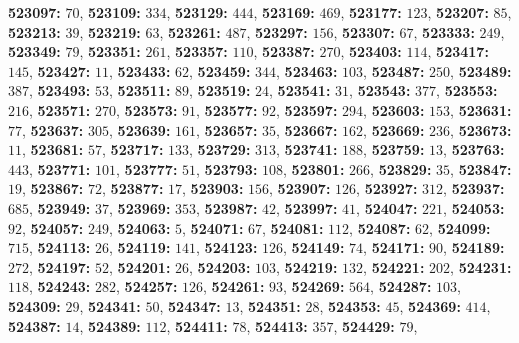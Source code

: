 \textsf{\bfseries 523097:} $70$, \textsf{\bfseries 523109:} $334$, \textsf{\bfseries 523129:} $444$, \textsf{\bfseries 523169:} $469$, \textsf{\bfseries 523177:} $123$, \textsf{\bfseries 523207:} $85$, \textsf{\bfseries 523213:} $39$, \textsf{\bfseries 523219:} $63$, \textsf{\bfseries 523261:} $487$, \textsf{\bfseries 523297:} $156$, \textsf{\bfseries 523307:} $67$, \textsf{\bfseries 523333:} $249$, \textsf{\bfseries 523349:} $79$, \textsf{\bfseries 523351:} $261$, \textsf{\bfseries 523357:} $110$, \textsf{\bfseries 523387:} $270$, \textsf{\bfseries 523403:} $114$, \textsf{\bfseries 523417:} $145$, \textsf{\bfseries 523427:} $11$, \textsf{\bfseries 523433:} $62$, \textsf{\bfseries 523459:} $344$, \textsf{\bfseries 523463:} $103$, \textsf{\bfseries 523487:} $250$, \textsf{\bfseries 523489:} $387$, \textsf{\bfseries 523493:} $53$, \textsf{\bfseries 523511:} $89$, \textsf{\bfseries 523519:} $24$, \textsf{\bfseries 523541:} $31$, \textsf{\bfseries 523543:} $377$, \textsf{\bfseries 523553:} $216$, \textsf{\bfseries 523571:} $270$, \textsf{\bfseries 523573:} $91$, \textsf{\bfseries 523577:} $92$, \textsf{\bfseries 523597:} $294$, \textsf{\bfseries 523603:} $153$, \textsf{\bfseries 523631:} $77$, \textsf{\bfseries 523637:} $305$, \textsf{\bfseries 523639:} $161$, \textsf{\bfseries 523657:} $35$, \textsf{\bfseries 523667:} $162$, \textsf{\bfseries 523669:} $236$, \textsf{\bfseries 523673:} $11$, \textsf{\bfseries 523681:} $57$, \textsf{\bfseries 523717:} $133$, \textsf{\bfseries 523729:} $313$, \textsf{\bfseries 523741:} $188$, \textsf{\bfseries 523759:} $13$, \textsf{\bfseries 523763:} $443$, \textsf{\bfseries 523771:} $101$, \textsf{\bfseries 523777:} $51$, \textsf{\bfseries 523793:} $108$, \textsf{\bfseries 523801:} $266$, \textsf{\bfseries 523829:} $35$, \textsf{\bfseries 523847:} $19$, \textsf{\bfseries 523867:} $72$, \textsf{\bfseries 523877:} $17$, \textsf{\bfseries 523903:} $156$, \textsf{\bfseries 523907:} $126$, \textsf{\bfseries 523927:} $312$, \textsf{\bfseries 523937:} $685$, \textsf{\bfseries 523949:} $37$, \textsf{\bfseries 523969:} $353$, \textsf{\bfseries 523987:} $42$, \textsf{\bfseries 523997:} $41$, \textsf{\bfseries 524047:} $221$, \textsf{\bfseries 524053:} $92$, \textsf{\bfseries 524057:} $249$, \textsf{\bfseries 524063:} $5$, \textsf{\bfseries 524071:} $67$, \textsf{\bfseries 524081:} $112$, \textsf{\bfseries 524087:} $62$, \textsf{\bfseries 524099:} $715$, \textsf{\bfseries 524113:} $26$, \textsf{\bfseries 524119:} $141$, \textsf{\bfseries 524123:} $126$, \textsf{\bfseries 524149:} $74$, \textsf{\bfseries 524171:} $90$, \textsf{\bfseries 524189:} $272$, \textsf{\bfseries 524197:} $52$, \textsf{\bfseries 524201:} $26$, \textsf{\bfseries 524203:} $103$, \textsf{\bfseries 524219:} $132$, \textsf{\bfseries 524221:} $202$, \textsf{\bfseries 524231:} $118$, \textsf{\bfseries 524243:} $282$, \textsf{\bfseries 524257:} $126$, \textsf{\bfseries 524261:} $93$, \textsf{\bfseries 524269:} $564$, \textsf{\bfseries 524287:} $103$, \textsf{\bfseries 524309:} $29$, \textsf{\bfseries 524341:} $50$, \textsf{\bfseries 524347:} $13$, \textsf{\bfseries 524351:} $28$, \textsf{\bfseries 524353:} $45$, \textsf{\bfseries 524369:} $414$, \textsf{\bfseries 524387:} $14$, \textsf{\bfseries 524389:} $112$, \textsf{\bfseries 524411:} $78$, \textsf{\bfseries 524413:} $357$, \textsf{\bfseries 524429:} $79$, 
